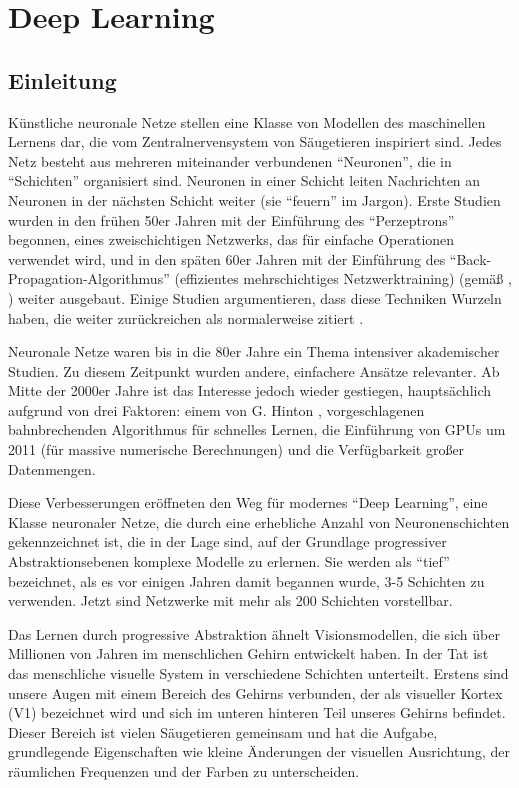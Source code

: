 \chapter{Deep Learning}
\section{Einleitung}
Künstliche neuronale Netze stellen eine Klasse von Modellen des maschinellen Lernens dar, die vom Zentralnervensystem von Säugetieren inspiriert sind. Jedes Netz besteht aus mehreren miteinander verbundenen \enquote{Neuronen}, die in \enquote{Schichten} organisiert sind. Neuronen in einer Schicht leiten Nachrichten an Neuronen in der nächsten Schicht weiter (sie \enquote{feuern} im Jargon). Erste Studien wurden in den frühen 50er Jahren mit der Einführung des \enquote{Perzeptrons} \cite{Rosenblatt} begonnen, eines zweischichtigen Netzwerks, das für einfache Operationen verwendet wird, und in den späten 60er Jahren mit der Einführung des \enquote{Back-Propagation-Algorithmus} (effizientes mehrschichtiges Netzwerktraining) (gemäß \cite{Werbos1990}, \cite{Hinton}) weiter ausgebaut. Einige Studien argumentieren, dass diese Techniken Wurzeln haben, die weiter zurückreichen als normalerweise zitiert \cite{Schmidhuber2014}.

Neuronale Netze waren bis in die 80er Jahre ein Thema intensiver akademischer Studien. Zu diesem Zeitpunkt wurden andere, einfachere Ansätze relevanter. Ab Mitte der 2000er Jahre ist das Interesse jedoch wieder gestiegen, hauptsächlich aufgrund von drei Faktoren: einem von G. Hinton \cite{Hinton}, \cite{Rumelhart1986} vorgeschlagenen bahnbrechenden Algorithmus für schnelles Lernen, die Einführung von GPUs um 2011 (für massive numerische Berechnungen) und die Verfügbarkeit großer Datenmengen.

Diese Verbesserungen eröffneten den Weg für modernes \enquote{Deep Learning}, eine Klasse neuronaler Netze, die durch eine erhebliche Anzahl von Neuronenschichten gekennzeichnet ist, die in der Lage sind, auf der Grundlage progressiver Abstraktionsebenen komplexe Modelle zu erlernen. Sie werden als \enquote{tief} bezeichnet, als es vor einigen Jahren damit begannen wurde, 3-5 Schichten zu verwenden. Jetzt sind Netzwerke mit mehr als 200 Schichten vorstellbar.

Das Lernen durch progressive Abstraktion ähnelt Visionsmodellen, die sich über Millionen von Jahren im menschlichen Gehirn entwickelt haben. In der Tat ist das menschliche visuelle System in verschiedene Schichten unterteilt. Erstens sind unsere Augen mit einem Bereich des Gehirns verbunden, der als visueller Kortex (V1) bezeichnet wird und sich im unteren hinteren Teil unseres Gehirns befindet. Dieser Bereich ist vielen Säugetieren gemeinsam und hat die Aufgabe, grundlegende Eigenschaften wie kleine Änderungen der visuellen Ausrichtung, der räumlichen Frequenzen und der Farben zu unterscheiden.

